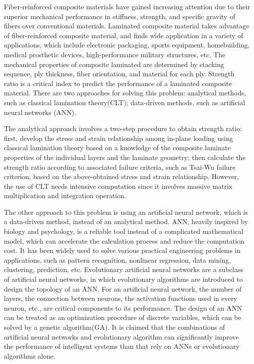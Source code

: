 \documentclass[letterpaper]{IEEEtran}
\begin{document}
Fiber-reinforced composite materials have gained increasing attention due to
their superior mechanical performance in stiffness, strength, and specific
gravity of fibers over conventional materials. Laminated composite material
takes advantage of fiber-reinforced composite material, and finds wide
application in a variety of applications, which include electronic packaging,
sports equipment, homebuilding, medical prosthetic devices, high-performance
military structures, etc. The mechanical properties of composite laminated are
determined by stacking sequence, ply thickness, fiber orientation, and material
for each ply. Strength ratio\cite{todoroki1998stacking,liu2000permutation,sivakumar1998optimum,walker2003technique,lin2004stacking,kang2005minimum,murugan2007target,akbulut2008optimum} is a critical
index to predict the performance of a laminated composite material. There are
two approaches for solving this problem: analytical methods, such as classical
lamination theory(CLT); data-driven methods, such as artificial neural networks
(ANN).

The analytical approach involves a two-step procedure to obtain strength ratio:
first, develop the stress and strain relationship among in-plane loading using
classical lamination theory based on a knowledge of the composite laminate
properties of the individual layers and the laminate geometry; then calculate
the strength ratio according to associated failure criteria, such as Tsai-Wu
failure criterion, based on the above-obtained stress and strain relationship.
However, the use of CLT needs intensive computation since it involves massive
matrix multiplication and integration operation.

The other approach to this problem is using an artificial neural network, which
is a data-driven method, instead of an analytical method. ANN, heavily inspired
by biology and psychology, is a reliable tool instead of a complicated
mathematical model, which can accelerate the calculation process and reduce the
computation cost. It has been widely used to solve various practical engineering
problems in applications\cite{YAN2020108014,MENTGES2021108736}, such as pattern recognition, nonlinear
regression, data mining, clustering, prediction, etc. Evolutionary artificial
neural networks are a subclass of artificial neural networks, in which
evolutionary algorithms are introduced to design the topology of an ANN. For an
artificial neural network, the number of layers, the connection between neurons,
the activation functions used in every neuron, etc., are critical components to
its performance. The design of an ANN can be treated as an optimization
procedure of discrete variables, which can be solved by a genetic algorithm(GA).
It is claimed that the combinations of artificial neural networks and
evolutionary algorithm\cite{lobo2007parameter} can significantly improve the performance of
intelligent systems than that rely on ANNs or evolutionary algorithms alone.
\end{document}
